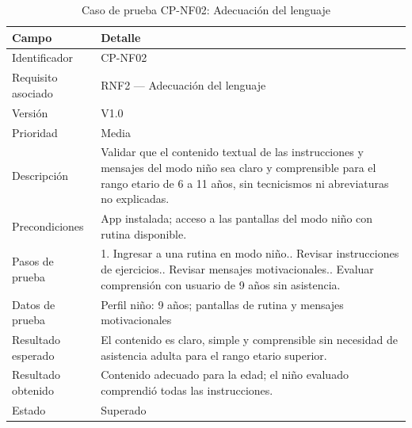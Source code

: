 				\begin{table}[H]
					\centering\small
					\caption{Caso de prueba CP-NF02: Adecuación del lenguaje}
					\label{tab:cpnf02}
					\begin{tabular}{p{3cm}p{12.0cm}}
						\hline
						\textbf{Campo} & \textbf{Detalle}\\
						\hline
						Identificador & CP-NF02\\
						Requisito asociado & RNF2 --- Adecuación del lenguaje\\
						Versión & V1.0\\
						Prioridad & Media\\
						Descripción & Validar que el contenido textual de las instrucciones y mensajes del modo niño sea claro y comprensible para el rango etario de 6 a 11 años, sin tecnicismos ni abreviaturas no explicadas.\\
						Precondiciones & App instalada; acceso a las pantallas del modo niño con rutina disponible.\\
						Pasos de prueba & 1. Ingresar a una rutina en modo niño.\newline 2. Revisar instrucciones de ejercicios.\newline 3. Revisar mensajes motivacionales.\newline 4. Evaluar comprensión con usuario de 9 años sin asistencia.\\
						Datos de prueba & Perfil niño: 9 años; pantallas de rutina y mensajes motivacionales\\
						Resultado esperado & El contenido es claro, simple y comprensible sin necesidad de asistencia adulta para el rango etario superior.\\
						Resultado obtenido & Contenido adecuado para la edad; el niño evaluado comprendió todas las instrucciones.\\
						Estado & Superado\\
						\hline
					\end{tabular}
				\end{table}
				\tblnote
				
